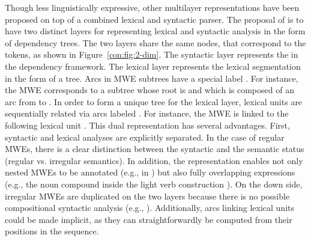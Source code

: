 \documentclass[output=paper]{langsci/langscibook}
\begin{document}
Though less linguistically expressive, other multilayer representations have been proposed on top of a combined lexical and syntactic parser. The proposal of \citet{constant16deep} is to have two distinct layers for representing lexical and syntactic analysis in the form of dependency trees. The two layers share the same nodes, that correspond to the tokens, as shown in Figure~\ref{con:fig:2-dim}. 
The syntactic layer represents the  in the dependency framework. The lexical layer represents the lexical segmentation in the form of a tree. 
Arcs in MWE subtrees have a special label . For instance, the MWE  corresponds to a subtree whose root is  and which is composed of an  arc from  to .  In order to form a unique tree for the lexical layer, lexical units are sequentially related via arcs labeled . For instance, the MWE  is linked to the following lexical unit . 
This dual representation has several advantages. First, syntactic and lexical analyses are explicitly separated. In the case of regular MWEs, there is a clear distinction between the syntactic and the semantic status (regular  vs. irregular semantics). In addition, the representation enables not only nested MWEs to be annotated (e.g.,   in ) but also fully overlapping expressions (e.g., the noun compound  inside the light verb construction ). 
On the down side, irregular MWEs are duplicated on the two layers because there is no possible compositional syntactic analysis (e.g., ). Additionally, arcs linking lexical units could be made implicit, as they can straightforwardly be computed from their positions in the sequence.
\end{document}
